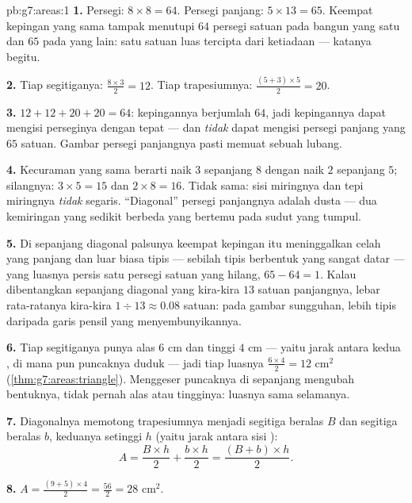 \begin{solution}{pb:g7:areas:1}
\textbf{1.} Persegi: $8 \times 8 = 64$. Persegi panjang:
$5 \times 13 = 65$. Keempat kepingan yang sama tampak menutupi $64$
persegi satuan pada bangun yang satu dan $65$ pada yang lain: satu
satuan luas tercipta dari ketiadaan --- katanya begitu.

\textbf{2.} Tiap segitiganya: $\frac{8 \times 3}{2} = 12$. Tiap
trapesiumnya: $\frac{(5 + 3) \times 5}{2} = 20$.

\textbf{3.} $12 + 12 + 20 + 20 = 64$: kepingannya berjumlah $64$,
jadi kepingannya dapat mengisi perseginya dengan tepat --- dan
\emph{tidak} dapat mengisi persegi panjang yang $65$ satuan. Gambar
persegi panjangnya pasti memuat sebuah lubang.

\textbf{4.} Kecuraman yang sama berarti naik $3$ sepanjang $8$
 dengan naik $2$ sepanjang $5$;  silangnya:
$3 \times 5 = 15$ dan $2 \times 8 = 16$. Tidak sama: sisi
miringnya dan tepi miringnya \emph{tidak} segaris.
``Diagonal'' persegi panjangnya adalah dusta --- dua kemiringan yang
sedikit berbeda yang bertemu pada sudut yang tumpul.

\textbf{5.} Di sepanjang diagonal palsunya keempat kepingan itu
meninggalkan celah yang panjang dan luar biasa tipis --- sebilah
tipis berbentuk  yang sangat datar --- yang luasnya
persis satu persegi satuan yang hilang, $65 - 64 = 1$. Kalau
dibentangkan sepanjang diagonal yang kira-kira $13$ satuan
panjangnya, lebar rata-ratanya kira-kira
$1 \div 13 \approx 0.08$ satuan: pada gambar sungguhan, lebih tipis
daripada garis pensil yang menyembunyikannya.

\textbf{6.} Tiap segitiganya punya alas $6$ cm dan tinggi $4$ cm ---
yaitu jarak antara kedua , di mana pun puncaknya
duduk --- jadi tiap luasnya $\frac{6 \times 4}{2} = 12$ cm$^2$
(\cref{thm:g7:areas:triangle}). Menggeser puncaknya di sepanjang
 mengubah bentuknya, tidak pernah alas atau
tingginya: luasnya sama selamanya.

\textbf{7.} Diagonalnya memotong trapesiumnya menjadi segitiga
beralas $B$ dan segitiga beralas $b$, keduanya setinggi $h$ (yaitu
jarak antara sisi ):
\[
A = \frac{B \times h}{2} + \frac{b \times h}{2}
= \frac{(B + b) \times h}{2} .
\]

\textbf{8.} $A = \frac{(9 + 5) \times 4}{2} = \frac{56}{2} =
28$ cm$^2$.


\end{solution}

